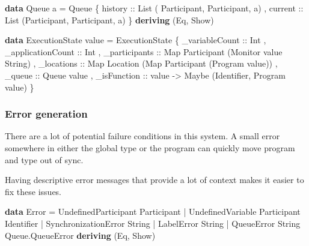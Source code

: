 \documentclass[runningheads]{llncs}
\newenvironment{Shaded}{}{}
\newcommand{\KeywordTok}[1]{\textcolor[rgb]{0.00,0.44,0.13}{\textbf{#1}}}
\newcommand{\DataTypeTok}[1]{\textcolor[rgb]{0.56,0.13,0.00}{#1}}
\newcommand{\OtherTok}[1]{\textcolor[rgb]{0.00,0.44,0.13}{#1}}
\newcommand{\FunctionTok}[1]{\textcolor[rgb]{0.02,0.16,0.49}{#1}}
\newcommand{\NormalTok}[1]{#1}
\begin{document}
\begin{Shaded}
\begin{Highlighting}[]
\KeywordTok{data} \DataTypeTok{Queue}\NormalTok{ a }\FunctionTok{=} \DataTypeTok{Queue} 
\NormalTok{    \{}\OtherTok{ history ::} \DataTypeTok{List}\NormalTok{ ( }\DataTypeTok{Participant}\NormalTok{, }\DataTypeTok{Participant}\NormalTok{, a)}
\NormalTok{    ,}\OtherTok{ current ::} \DataTypeTok{List}\NormalTok{ (}\DataTypeTok{Participant}\NormalTok{, }\DataTypeTok{Participant}\NormalTok{, a)}
\NormalTok{    \}}
    \KeywordTok{deriving}\NormalTok{ (}\DataTypeTok{Eq}\NormalTok{, }\DataTypeTok{Show}\NormalTok{)}

\KeywordTok{data} \DataTypeTok{ExecutionState}\NormalTok{ value }\FunctionTok{=} 
    \DataTypeTok{ExecutionState} 
\NormalTok{        \{}\OtherTok{ _variableCount ::} \DataTypeTok{Int}
\NormalTok{        ,}\OtherTok{ _applicationCount ::} \DataTypeTok{Int}
\NormalTok{        ,}\OtherTok{ _participants ::} \DataTypeTok{Map} \DataTypeTok{Participant}\NormalTok{ (}\DataTypeTok{Monitor}\NormalTok{ value }\DataTypeTok{String}\NormalTok{)}
\NormalTok{        ,}\OtherTok{ _locations ::} \DataTypeTok{Map} \DataTypeTok{Location}\NormalTok{ (}\DataTypeTok{Map} \DataTypeTok{Participant}\NormalTok{ (}\DataTypeTok{Program}\NormalTok{ value))}
\NormalTok{        ,}\OtherTok{ _queue ::} \DataTypeTok{Queue}\NormalTok{ value}
\NormalTok{        ,}\OtherTok{ _isFunction ::}\NormalTok{ value }\OtherTok{->} \DataTypeTok{Maybe}\NormalTok{ (}\DataTypeTok{Identifier}\NormalTok{, }\DataTypeTok{Program}\NormalTok{ value)}
\NormalTok{        \}}
\end{Highlighting}
\end{Shaded}

\subsubsection{Error generation}\label{error-generation}

There are a lot of potential failure conditions in this system. A small
error somewhere in either the global type or the program can quickly
move program and type out of sync.

Having descriptive error messages that provide a lot of context makes it
easier to fix these issues.

\begin{Shaded}
\begin{Highlighting}[]
\KeywordTok{data} \DataTypeTok{Error} 
    \FunctionTok{=} \DataTypeTok{UndefinedParticipant} \DataTypeTok{Participant}
    \FunctionTok{|} \DataTypeTok{UndefinedVariable} \DataTypeTok{Participant} \DataTypeTok{Identifier}
    \FunctionTok{|} \DataTypeTok{SynchronizationError} \DataTypeTok{String}
    \FunctionTok{|} \DataTypeTok{LabelError} \DataTypeTok{String}
    \FunctionTok{|} \DataTypeTok{QueueError} \DataTypeTok{String} \DataTypeTok{Queue.QueueError}
    \KeywordTok{deriving}\NormalTok{ (}\DataTypeTok{Eq}\NormalTok{, }\DataTypeTok{Show}\NormalTok{)}
\end{Highlighting}
\end{Shaded}
\end{document}
